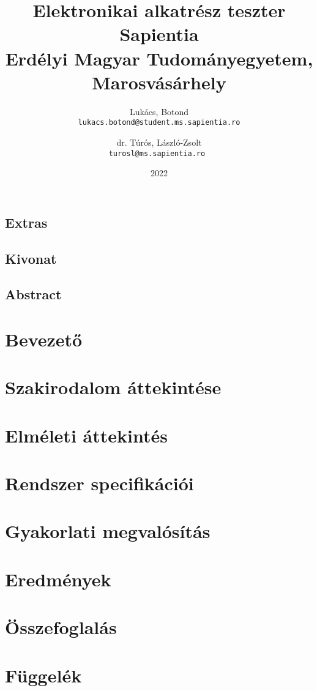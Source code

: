 \documentclass[12pt, twosides]{report}
\title{
	{Elektronikai alkatrész teszter}\\
	{\large Sapientia\\
	Erdélyi Magyar Tudományegyetem, Marosvásárhely}
}
\author{
	Lukács, Botond\\
	\texttt{lukacs.botond@student.ms.sapientia.ro}
	\and
	dr. Túrós, László-Zsolt\\
	\texttt{turosl@ms.sapientia.ro }	
}
\date{2022}
\begin{document}


\section*{Extras}

\pagebreak



\section*{Kivonat}

\pagebreak

\section*{Abstract}

\pagebreak


\tableofcontents

\listoffigures

\chapter{Bevezető}


\chapter{Szakirodalom áttekintése}


\chapter{Elméleti áttekintés}


\chapter{Rendszer specifikációi}


\chapter{Gyakorlati megvalósítás} \label{chpt:implementation}


\chapter{Eredmények}


\chapter{Összefoglalás}





\appendix
\chapter{Függelék}

\end{document}
